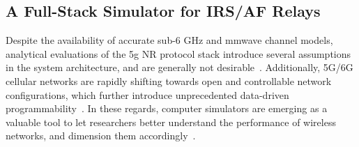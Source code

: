 
\subsection{A Full-Stack Simulator for IRS/AF Relays}
\label{sec:simulator}

Despite the availability of accurate sub-6 GHz and \gls{mmwave} channel models, analytical evaluations of the \gls{5g} NR protocol stack introduce several assumptions in the system architecture, and are generally not desirable~\cite{gkonis2020comprehensive}. 
Additionally, 5G/6G cellular networks are rapidly shifting towards open and controllable network configurations, which further introduce unprecedented data-driven programmability~\cite{bonati2020open}. 
In these regards, computer simulators are emerging as a valuable tool to let researchers better understand the performance of wireless networks, and dimension them accordingly~\cite{wilhelmi2021usage}.  

